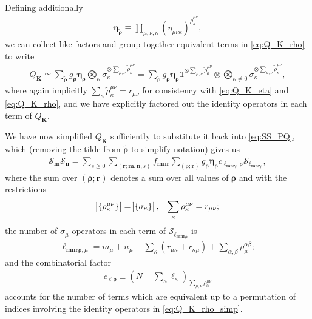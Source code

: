\documentclass[aps,notitlepage,nofootinbib,11pt]{revtex4-1}
\newcommand{\p}[1]{\left(#1\right)} %
\renewcommand{\set}[1]{\left\{#1\right\}} %
\renewcommand{\v}{\bm} %
\renewcommand{\S}{\mathcal{S}}
\newcommand{\1}{\mathds{1}}
\begin{document}
Defining additionally
\begin{align}
  \v\eta_{\tilde{\v\rho}}
  \equiv \prod_{\mu,\nu,\kappa}
  \p{\eta_{\mu\nu\kappa}}^{\tilde\rho^{\mu\nu}_\kappa},
  \label{eq:eta_rho}
\end{align}
we can collect like factors and group together equivalent terms in
\eqref{eq:Q_K_rho} to write
\begin{align}
  Q_{\v K}
  \simeq \sum_{\tilde{\v\rho}} g_{\tilde{\v\rho}} \v\eta_{\tilde{\v\rho}}
  \bigotimes_{\kappa}
  \sigma_\kappa^{\otimes\sum_{\mu,\nu}\tilde\rho^{\mu\nu}_\kappa}
  = \sum_{\tilde{\v\rho}} g_{\tilde{\v\rho}} \v\eta_{\tilde{\v\rho}}
  \1^{\otimes\sum_{\mu,\nu}\tilde\rho^{\mu\nu}_0}
  \otimes \bigotimes_{\kappa\ne0}
  \sigma_\kappa^{\otimes\sum_{\mu,\nu}\tilde\rho^{\mu\nu}_\kappa},
  \label{eq:Q_K_rho_simp}
\end{align}
where again implicitly
$\sum_\kappa\tilde\rho^{\mu\nu}_\kappa=r_{\mu\nu}$ for consistency
with \eqref{eq:Q_K_eta} and \eqref{eq:Q_K_rho}, and we have explicitly
factored out the identity operators in each term of $Q_{\v K}$.

We have now simplified $Q_{\v K}$ sufficiently to substitute it back
into \eqref{eq:SS_PQ}, which (removing the tilde from $\tilde{\v\rho}$
to simplify notation) gives us
\begin{align}
  \S_{\v m} \S_{\v n}
  = \sum_{s\ge0} \sum_{\p{\v r;\v m,\v n,s}} f_{\v m\v n\v r}
  \sum_{\p{\v\rho;\v r}} g_{\v\rho} \v\eta_{\v\rho}
  c_{\v\ell_{\v m\v n\v r\v\rho}\v\rho} \S_{\v\ell_{\v m\v n\v r\v\rho}},
  \label{eq:SS_simp}
\end{align}
where the sum over $\p{\v\rho;\v r}$ denotes a sum over all
values of $\v\rho$ and with the restrictions
\begin{align}
  \abs{\set{\rho^{\mu\nu}_\kappa}} = \abs{\set{\sigma_\kappa}},
  &&
  \sum_{\kappa} \rho^{\mu\nu}_\kappa = r_{\mu\nu};
\end{align}
the number of $\sigma_\mu$ operators in each term of
$\S_{\v\ell_{\v m\v n\v r\v\rho}}$ is
\begin{align}
  \ell_{\v m\v n\v r\v\rho;\mu}
  = m_\mu + n_\mu - \sum_\kappa \p{r_{\mu\kappa}+r_{\kappa\mu}}
  + \sum_{\alpha,\beta} \rho^{\alpha\beta}_\mu;
\end{align}
and the combinatorial factor
\begin{align}
  c_{\v\ell\v\rho}
  \equiv \p{ N - \sum_\kappa\ell_\kappa }_{\sum_{\mu,\nu}\rho^{\mu\nu}_0}
\end{align}
accounts for the number of terms which are equivalent up to a
permutation of indices involving the identity operators in
\eqref{eq:Q_K_rho_simp}.
\end{document}
